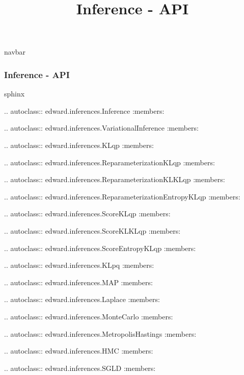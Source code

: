 \title{Inference - API}

{{navbar}}

\subsubsection{Inference - API}

{{sphinx

.. autoclass:: edward.inferences.Inference
   :members:

.. autoclass:: edward.inferences.VariationalInference
   :members:

.. autoclass:: edward.inferences.KLqp
   :members:

.. autoclass:: edward.inferences.ReparameterizationKLqp
   :members:

.. autoclass:: edward.inferences.ReparameterizationKLKLqp
   :members:

.. autoclass:: edward.inferences.ReparameterizationEntropyKLqp
   :members:

.. autoclass:: edward.inferences.ScoreKLqp
   :members:

.. autoclass:: edward.inferences.ScoreKLKLqp
   :members:

.. autoclass:: edward.inferences.ScoreEntropyKLqp
   :members:

.. autoclass:: edward.inferences.KLpq
   :members:

.. autoclass:: edward.inferences.MAP
   :members:

.. autoclass:: edward.inferences.Laplace
   :members:

.. autoclass:: edward.inferences.MonteCarlo
   :members:

.. autoclass:: edward.inferences.MetropolisHastings
   :members:

.. autoclass:: edward.inferences.HMC
   :members:

.. autoclass:: edward.inferences.SGLD
   :members:

}}
